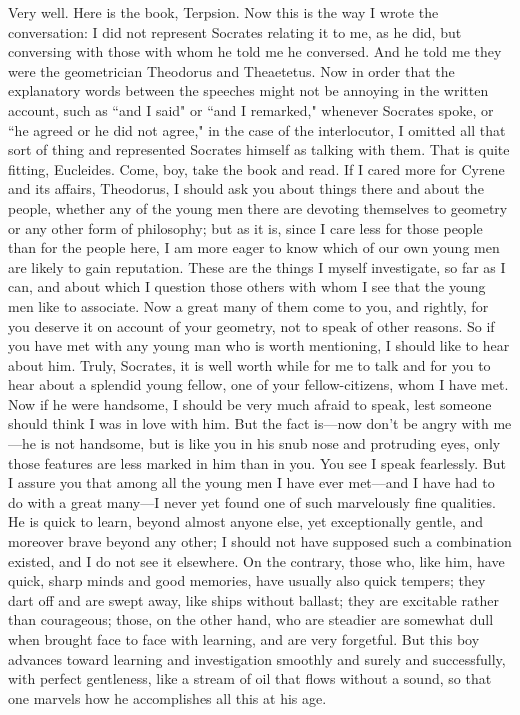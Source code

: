 \documentclass[letterpaper,12pt]{article}
\newcommand{\stephpag}[1]{\marginnote{\small\itshape\fontfamily{ppl}\selectfont #1}}
\begin{document}
\begin{drama}
\terpsionspeaks
Very well.
\eucleidesspeaks
Here is the book, Terpsion. Now this is the way I wrote the conversation: I did not represent Socrates relating it to me, as he did, but conversing with those with whom he told me he conversed. And he told me they were the geometrician Theodorus and Theaetetus. Now in order that \stephpag{c} the explanatory words between the speeches might not be annoying in the written account, such as ``and I said" or ``and I remarked," whenever Socrates spoke, or ``he agreed or he did not agree," in the case of the interlocutor, I omitted all that sort of thing and represented Socrates himself as talking with them.
\terpsionspeaks
That is quite fitting, Eucleides.
\eucleidesspeaks
Come, boy, take the book and read. \stephpag{d}
\socratesspeaks
If I cared more for Cyrene and its affairs, Theodorus, I should ask you about things there and about the people, whether any of the young men there are devoting themselves to geometry or any other form of philosophy; but as it is, since I care less for those people than for the people here, I am more eager to know which of our own young men are likely to gain reputation. These are the things I myself investigate, so far as I can, and about which I question those others with whom I see that the young men like to associate. Now a great many of them come to you, and rightly, \stephpag{e} for you deserve it on account of your geometry, not to speak of other reasons. So if you have met with any young man who is worth mentioning, I should like to hear about him.
\theodorusspeaks
Truly, Socrates, it is well worth while for me to talk and for you to hear about a splendid young fellow, one of your fellow-citizens, whom I have met. Now if he were handsome, I should be very much afraid to speak, lest someone should think I was in love with him. But the fact is—now don't be angry with me—he is not handsome, but is like you in his snub nose and protruding eyes, only those features are less marked in him than in you. \stephpag{144 a} You see I speak fearlessly. But I assure you that among all the young men I have ever met—and I have had to do with a great many—I never yet found one of such marvelously fine qualities. He is quick to learn, beyond almost anyone else, yet exceptionally gentle, and moreover brave beyond any other; I should not have supposed such a combination existed, and I do not see it elsewhere. On the contrary, those who, like him, have quick, sharp minds and good memories, have usually also quick tempers; they dart off and are swept away, \stephpag{b} like ships without ballast; they are excitable rather than courageous; those, on the other hand, who are steadier are somewhat dull when brought face to face with learning, and are very forgetful. But this boy advances toward learning and investigation smoothly and surely and successfully, with perfect gentleness, like a stream of oil that flows without a sound, so that one marvels how he accomplishes all this at his age.

\end{drama}
\end{document}
